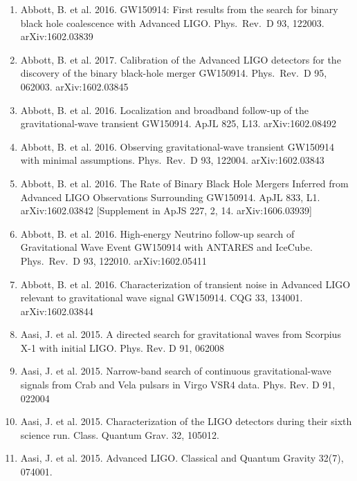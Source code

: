 \documentclass[margin,line]{res}
\begin{document}
\begin{resume}
\begin{enumerate}
\item Abbott, B. et al. 2016. GW150914: First results from the search for binary black hole coalescence with Advanced LIGO.  Phys.~Rev.~D 93, 122003.  arXiv:1602.03839

\item Abbott, B. et al. 2017. Calibration of the Advanced LIGO detectors for the discovery of the binary black-hole merger GW150914.   Phys.~Rev.~D 95, 062003.  arXiv:1602.03845

\item Abbott, B. et al. 2016. Localization and broadband follow-up of the gravitational-wave transient GW150914.   ApJL 825, L13. arXiv:1602.08492

\item Abbott, B. et al. 2016. Observing gravitational-wave transient GW150914 with minimal assumptions.  Phys.~Rev.~D 93, 122004. arXiv:1602.03843

\item Abbott, B. et al. 2016. The Rate of Binary Black Hole Mergers Inferred from Advanced LIGO Observations Surrounding GW150914. ApJL 833, L1.  arXiv:1602.03842  [Supplement in ApJS 227, 2, 14. arXiv:1606.03939]

\item Abbott, B. et al. 2016.  High-energy Neutrino follow-up search of Gravitational Wave Event GW150914 with ANTARES and IceCube.   Phys.~Rev.~D 93, 122010. arXiv:1602.05411

\item Abbott, B. et al. 2016. Characterization of transient noise in Advanced LIGO relevant to gravitational wave signal GW150914.   CQG 33, 134001. arXiv:1602.03844

\item Aasi, J. et al. 2015. A directed search for gravitational waves from Scorpius X-1 with initial LIGO.  Phys. Rev. D 91, 062008

\item Aasi, J. et al. 2015. Narrow-band search of continuous gravitational-wave signals from Crab and Vela pulsars in Virgo VSR4 data.  Phys. Rev. D 91, 022004

\item Aasi, J. et al. 2015. Characterization of the LIGO detectors during their sixth science run. Class. Quantum Grav. 32, 105012.

\item Aasi, J. et al. 2015. Advanced LIGO. Classical and Quantum Gravity 32(7), 074001. 


\end{enumerate}
\end{resume}
\end{document}
